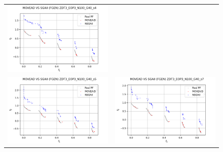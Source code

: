 \begin{figure}[H]
\begin{tabular}{c c}
    \includegraphics[scale=0.5]{figures/ZDT3_EOP3_N100_G40_T15/s4_comp.png}\\
    \includegraphics[scale=0.5]{figures/ZDT3_EOP3_N100_G40_T15/s5_comp.png} &
    \includegraphics[scale=0.5]{figures/ZDT3_EOP3_N100_G40_T15/s7_comp.png}\\

\end{tabular}
\end{figure}
